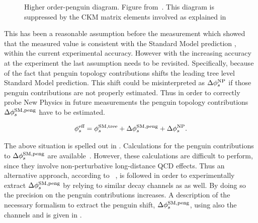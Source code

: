 \begin{figure}[!h]
  \centering
  {\sffamily }
  \caption{ Higher order-penguin diagram. Figure from~\cite{jeroenThesis}. This diagram is suppressed by the CKM matrix elements involved as explained in }
  \label{bs2jpsiphi_peng}
\end{figure}

This has been a reasonable assumption before the \lhcb measurement which showed that the measured  value is consistent with the Standard
Model prediction , within the current experimental accuracy. However with the increasing accuracy at the \lhcb experiment the last assumption needs to be revisited.
Specifically, because of the fact that penguin topology contributions shifts the leading tree level Standard Model prediction.
This shift could be misinterpreted as $\Delta\phi_{s}^{\tiny\text {NP}}$ if those penguin contributions are not properly estimated.
Thus in order to correctly probe New Physics in future measurements the penguin topology contributions $\Delta\phi_{s}^{\tiny\text {SM,peng}}$
have to be estimated.

\begin{equation}
\centering
 \phis^{\text {eff}} = \phis^{\tiny \text{SM,tree}} + \Delta\phiS{SM,peng} + \Delta\phis^{\tiny \text{NP}}.
 \label{phis_sm_peng}
\end{equation}

\noindent The above situation is spelled out in .
Calculations for the penguin contributions to $\Delta\phi_{s}^{\tiny\text {SM,peng}}$ are available~\cite{Liu:2013nea,Frings:2015eva}.
However, these calculations are difficult to perform, since they involve non-perturbative long-distance QCD effects. Thus an alternative
approach, according to ~\cite{DeBruyn:2014oga,Frings:2015eva,Faller:2008gt,Liu:2013nea,DeBruyn-thesis}, is followed in order to experimentally extract $\Delta\phi_{s}^{\tiny\text {SM,peng}}$ by relying to
similar decay channels as \BsJpsiPhi as well. By doing so the precision on the penguin contributions increases. A description
of the necessary formalism to extract the penguin shift, $\Delta\phi_{s}^{\tiny\text {SM,peng}}$, using also the channels \BsJpsiKst and \BsJpsiRho is
given in .
